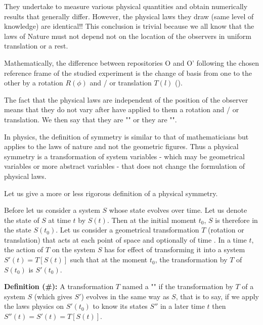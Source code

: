 	They undertake to measure various physical quantities and obtain numerically results that generally differ. However, the physical laws they draw (same level of knowledge) are identical!! This conclusion is trivial because we all know that the laws of Nature must not depend not on the location of the observers in uniform translation or a rest.

	Mathematically, the difference between repositories O and O' following the chosen reference frame of the studied experiment is the change of basis from one to the other by a rotation $R(\phi)$ and / or translation $T(l)$ ().

	The fact that the physical laws are independent of the position of the observer means that they do not vary after have applied to them a rotation and / or translation. We then say that they are "" or they are "".
	\begin{tcolorbox}[title=Remark,colframe=black,arc=10pt]
	In physics, the definition of symmetry is similar to that of mathematicians but applies to the laws of nature and not the geometric figures. Thus a physical symmetry is a transformation of system variables - which may be geometrical variables or more abstract variables - that does not change the formulation of physical laws.
	\end{tcolorbox}
	Let us give a more or less rigorous definition of a physical symmetry.

	Before let us consider a system $S$ whose state evolves over time. Let us denote the state of $S$ at time $t$ by $S(t)$. Then at the initial moment $t_0$, $S$ is therefore in the state $S(t_0)$. Let us consider a geometrical transformation $T$ (rotation or translation) that acts at each point of space and optionally of time . In a time $t$, the action of $T$ on the system $S$ has for effect of transforming it into a system $S'(t)=T[S(t)]$ such that at the moment $t_0$, the transformation by $T$ of $S(t_0)$ is $S'(t_0)$.
	
	\textbf{Definition (\#\mydef):} A transformation $T$ named a "" if the transformation by $T$ of a system $S$ (which gives $S'$) evolves in the same way as $S$, that is to say, if we apply the laws physics on $S'(t_0)$ to know its states $S''$ in a later time $t$ then $S''(t)=S'(t)=T[S(t)]$.
	
